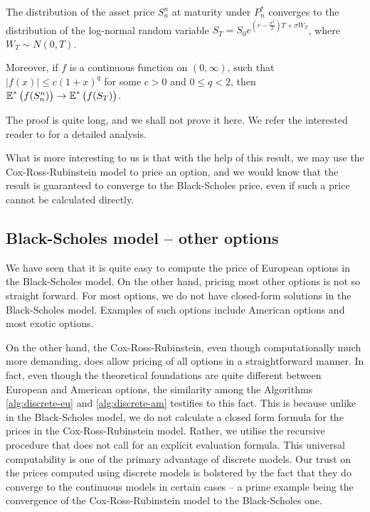 \begin{thm}
	The distribution of the asset price $ S_n^n $ at maturity under $ P_n^* $ converges to the distribution of the log-normal random variable $ S_T = S_0 e^{ ( r - \frac{\sigma^2}{2} ) T + \sigma W_T } $, where $ W_T \sim N(0, T) $.
	
	Moreover, if $ f $ is a continuous function on $ (0, \infty) $, such that $ |f(x)| \le c(1+x)^q $ for some $ c > 0 $ and $ 0 \le q < 2 $, then $ \operatorname{\mathbb{E}}^* \left( f(S_n^n) \right) \to \operatorname{\mathbb{E}}^* \left( f(S_T) \right) $.
\end{thm}

The proof is quite long, and we shall not prove it here. We refer the interested reader to \cite{He1989} for a detailed analysis.

What is more interesting to us is that with the help of this result, we may use the Cox-Ross-Rubinstein model to price an option, and we would know that the result is guaranteed to converge to the Black-Scholes price, even if such a price cannot be calculated directly.


\subsection{Black-Scholes model -- other options}
\label{subsec:continuous-other}

We have seen that it is quite easy to compute the price of European options in the Black-Scholes model. On the other hand, pricing most other options is not so straight forward. For most options, we do not have closed-form solutions in the Black-Scholes model. Examples of such options include American options and most exotic options.

On the other hand, the Cox-Ross-Rubinstein, even though computationally much more demanding, does allow pricing of all options in a straightforward manner. In fact, even though the theoretical foundations are quite different between European and American options, the similarity among the Algorithms \ref{alg:discrete-eu} and \ref{alg:discrete-am} testifies to this fact. This is because unlike in the Black-Scholes model, we do not calculate a closed form formula for the prices in the Cox-Ross-Rubinstein model. Rather, we utilise the recursive procedure that does not call for an explicit evaluation formula. This universal computability is one of the primary advantage of discrete models. Our trust on the prices computed using discrete models is bolstered by the fact that they do converge to the continuous models in certain cases -- a prime example being the convergence of the Cox-Ross-Rubinstein model to the Black-Scholes one.

